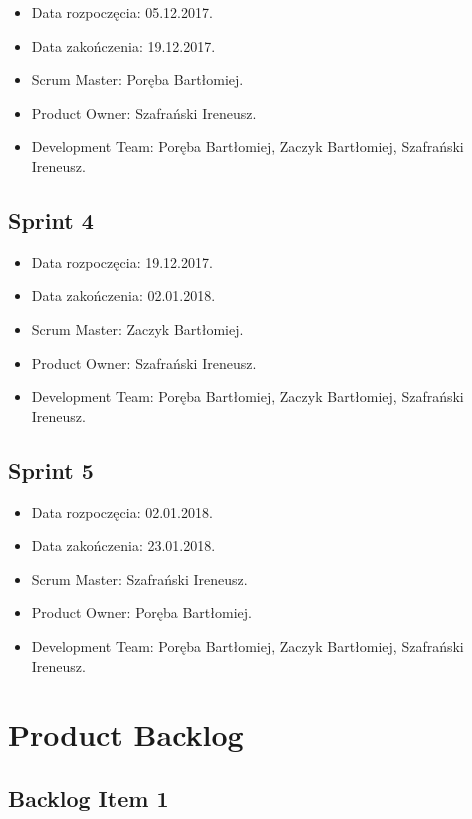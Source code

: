 \documentclass[a4paper]{article}
\begin{document}
\begin{itemize}
	\item Data rozpoczęcia: 05.12.2017.
	\item  Data zakończenia: 19.12.2017.
	\item Scrum Master: Poręba Bartłomiej.
	\item Product Owner: Szafrański Ireneusz.
	\item Development Team: Poręba Bartłomiej, Zaczyk Bartłomiej, Szafrański Ireneusz.
\end{itemize}

\subsection{Sprint 4}

\begin{itemize}
	\item Data rozpoczęcia: 19.12.2017.
	\item  Data zakończenia: 02.01.2018.
	\item Scrum Master: Zaczyk Bartłomiej.
	\item Product Owner: Szafrański Ireneusz.
	\item Development Team: Poręba Bartłomiej, Zaczyk Bartłomiej, Szafrański Ireneusz.
\end{itemize}

\subsection{Sprint 5}

\begin{itemize}
	\item Data rozpoczęcia: 02.01.2018.
	\item  Data zakończenia: 23.01.2018.
	\item Scrum Master: Szafrański Ireneusz.
	\item Product Owner: Poręba Bartłomiej.
	\item Development Team: Poręba Bartłomiej, Zaczyk Bartłomiej, Szafrański Ireneusz.
\end{itemize}


\section{Product Backlog}

\subsection{Backlog Item 1}
\end{document}
